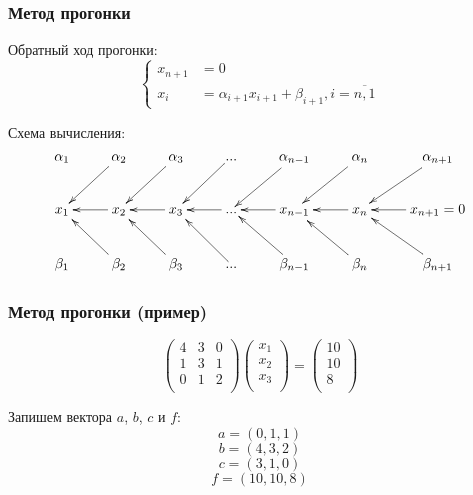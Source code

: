 \documentclass[10pt]{beamer}
\begin{document}
\begin{frame}[fragile]
\frametitle{Метод прогонки}
Обратный ход прогонки:
\begin{equation}
\label{sweepback}
\begin{cases}
x_{n+1} &= 0\\
x_{i} &= \alpha_{i+1} x_{i+1} + \beta_{i+1}, i = \overline{n,1}
\end{cases}
\end{equation}

Схема вычисления:
\begin{displaymath} 
\xymatrix{
\alpha_1 	& \alpha_2 \ar[ld] 	& \alpha_3 \ar[ld]	& ... \ar[ld]	& \alpha_{n-1} \ar[ld] 	& \alpha_n \ar[ld]	& \alpha_{n+1}	\ar[ld]\\ 
x_1 		& x_2 \ar[l]   		& x_3 \ar[l] 		& ... \ar[l] 	& x_{n-1} \ar[l]		& x_n \ar[l] 		&  x_{n+1} = 0 \ar[l]\\
\beta_1 	& \beta_2 \ar[ul] 	& \beta_3 \ar[ul]	& ... \ar[ul]	& \beta_{n-1} \ar[ul]	& \beta_n \ar[ul]	&  \beta_{n+1} \ar[ul]	\\
}
\end{displaymath}

\end{frame}


\begin{frame}[fragile]
\frametitle{Метод прогонки (пример)}

$$
\begin{pmatrix}
4&3&0 \\
1&3&1 \\
0&1&2 \\
\end{pmatrix}
\begin{pmatrix}
x_1\\
x_2\\
x_3\\
\end{pmatrix}
=
\begin{pmatrix}
10\\
10\\
8\\
\end{pmatrix}
$$

Запишем вектора $a$, $b$, $c$ и $f$:
$$a = (0, 1, 1)$$
$$b = (4, 3, 2)$$
$$c = (3, 1, 0)$$
$$f = (10, 10, 8)$$

\end{frame}
\end{document}
